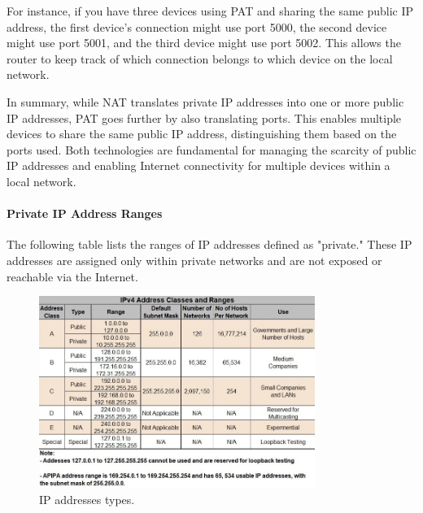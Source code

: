 For instance, if you have three devices using PAT and sharing the same public IP address, the first device's connection might use port 5000, the second device might use port 5001, and the third device might use port 5002. This allows the router to keep track of which connection belongs to which device on the local network.

In summary, while NAT translates private IP addresses into one or more public IP addresses, PAT goes further by also translating ports. This enables multiple devices to share the same public IP address, distinguishing them based on the ports used. Both technologies are fundamental for managing the scarcity of public IP addresses and enabling Internet connectivity for multiple devices within a local network.

\paragraph{Private IP Address Ranges}
The following table lists the ranges of IP addresses defined as "private." These IP addresses are assigned only within private networks and are not exposed or reachable via the Internet.

\begin{figure}[h!]
    \centering
    \includegraphics[width=0.8\textwidth]{images/ip_addresses.png}
    \caption{IP addresses types.}
    \label{fig:ip_address}
\end{figure}
